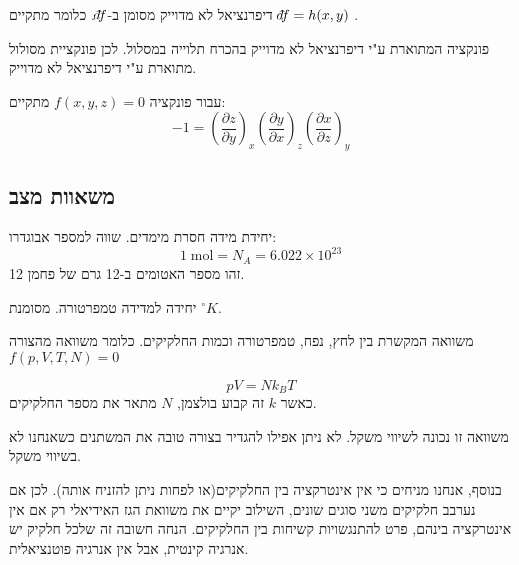 \documentclass{tstextbook}
\begin{document}
\begin{symbolize}
דיפרנציאל לא מדוייק מסומן ב-\(\;\bar{}\mkern-7.5mu df\). כלומר מתקיים \(\;\bar{}\mkern-7.5mu df=h(x,y)\) .

\end{symbolize}
\begin{corollary}
פונקציה המתוארת ע"י דיפרנציאל לא מדוייק בהכרח תלוייה במסלול. לכן פונקציית מסולול מתוארת ע"י דיפרנציאל לא מדוייק.

\end{corollary}
\begin{proposition}
עבור פונקציה \(f(x,y,z)=0\) מתקיים:
$$-1=\left({\frac{\partial z}{\partial y}}\right)_{x}\left({\frac{\partial y}{\partial x}}\right)_{z}\left({\frac{\partial x}{\partial z}}\right)_{y}$$

\end{proposition}
\subsection{משאוות מצב}

\begin{definition}[מול]
יחידת מידה חסרת מימדים. שווה למספר אבוגדרו:
$$1\;{\mathrm{mol}}=N_{A}=6.022\times10^{23}$$
זהו מספר האטומים ב-12 גרם של פחמן 12.

\end{definition}
\begin{definition}[קלווין]
יחידה למדידה טמפרטורה. מסומנת \(^\circ K\).

\end{definition}
\begin{definition}
משוואה המקשרת בין לחץ, נפח, טמפרטורה וכמות החלקיקים. כלומר משוואה מהצורה \(f\left(p,V,T,N \right)=0\)

\end{definition}
\begin{theorem}
$$pV = Nk_{B}T$$
כאשר \(k\) זה קבוע בולצמן, \(N\) מתאר את מספר החלקיקים.

\end{theorem}
\begin{remark}
משוואה זו נכונה לשיווי משקל. לא ניתן אפילו להגדיר בצורה טובה את המשתנים כשאנחנו לא בשיווי משקל.

\end{remark}
בנוסף, אנחנו מניחים כי אין אינטרקציה בין החלקיקים(או לפחות ניתן להזניח אותה). לכן אם נערבב חלקיקים משני סוגים שונים, השילוב יקיים את משוואת הגז האידיאלי רק אם אין אינטרקציה בינהם, פרט להתנגשויות קשיחות בין החלקיקים. הנחה חשובה זה שלכל חלקיק יש אנרגיה קינטית, אבל אין אנרגיה פוטנציאלית.
\end{document}
